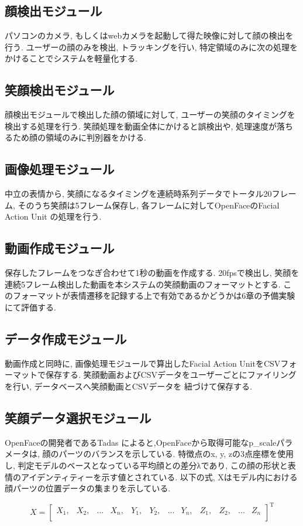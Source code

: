 \subsection{顔検出モジュール}
パソコンのカメラ, もしくはwebカメラを起動して得た映像に対して顔の検出を行う.
ユーザーの顔のみを検出, トラッキングを行い, 特定領域のみに次の処理をかけることでシステムを軽量化する.
\subsection{笑顔検出モジュール}
顔検出モジュールで検出した顔の領域に対して, ユーザーの笑顔のタイミングを検出する処理を行う.
笑顔処理を動画全体にかけると誤検出や,  処理速度が落ちるため顔の領域のみに判別器をかける.
\subsection{画像処理モジュール}
中立の表情から, 笑顔になるタイミングを連続時系列データでトータル20フレーム, そのうち笑顔は5フレーム保存し,
各フレームに対してOpenFaceのFacial Action Unit の処理を行う.
\subsection{動画作成モジュール}
保存したフレームをつなぎ合わせて1秒の動画を作成する.
20fpsで検出し, 笑顔を連続5フレーム検出した動画を本システムの笑顔動画のフォーマットとする.
このフォーマットが表情遷移を記録する上で有効であるかどうかは6章の予備実験にて評価する.
\subsection{データ作成モジュール}
動画作成と同時に, 画像処理モジュールで算出したFacial Action UnitをCSVフォーマットで保存する.
笑顔動画およびCSVデータをユーザーごとにファイリングを行い, データベースへ笑顔動画とCSVデータを
紐づけて保存する.
\subsection{笑顔データ選択モジュール}
OpenFaceの開発者であるTadas \cite{tadas} によると,OpenFaceから取得可能なp\_scaleパラメータは,
顔のパーツのバランスを示している.
特徴点のx, y, zの3点座標を使用し, 判定モデルのベースとなっている平均顔との差分λであり,
この顔の形状と表情のアイデンティティーを示す値とされている.
以下の式, Xはモデル内における顔パーツの位置データの集まりを示している.

\begin{equation}
  X =
  \left[
  \begin{array}{cccccccccccc}
  X_1, & X_2, & ... & X_n, & Y_1, & Y_2, & ... & Y_n, & Z_1, & Z_2, & ... & Z_n \\
  \end{array}
  \right]
  ^{\mathrm{T}}
\end{equation}

